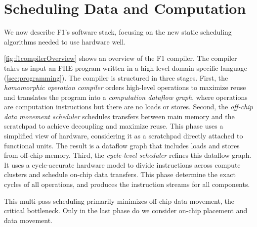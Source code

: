 \section{Scheduling Data and Computation}\label{sec:scheduler}

We now describe F1's software stack,
focusing on the new static scheduling algorithms
needed to use hardware well.

\figFOneCompilerOverview

\autoref{fig:f1compilerOverview} shows an overview of the F1 compiler.
The compiler takes as input an FHE program written in a high-level domain specific language (\autoref{sec:programming}).
The compiler is structured in three stages.
First, the \emph{homomorphic operation compiler} 
orders high-level operations to maximize reuse and
translates the program into a \emph{computation dataflow graph},
where operations are computation instructions but there are no loads or stores.
Second, the \emph{off-chip data movement scheduler} %
schedules transfers between main memory and the scratchpad to achieve decoupling and maximize reuse.
This phase uses a simplified view of hardware, considering it as
a scratchpad directly attached to functional units. %
The result is a dataflow graph that includes loads and stores from off-chip memory.
Third, the \emph{cycle-level scheduler} refines this dataflow graph.
It uses a cycle-accurate hardware model to divide instructions across compute clusters
and schedule on-chip data transfers.
This phase determine the exact cycles of all operations, and produces the instruction streams for all components.

This multi-pass scheduling primarily minimizes off-chip data movement, the critical bottleneck.
Only in the last phase do we consider on-chip placement and data movement.

